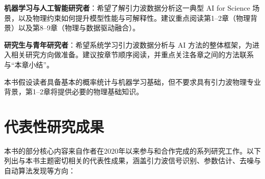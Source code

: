 \textbf{机器学习与人工智能研究者}：希望了解引力波数据分析这一典型 AI for Science 场景，以及物理约束如何提升模型性能与可解释性。建议重点阅读第1--2章（物理背景）以及第8--9章（物理与数据驱动融合）。

\textbf{研究生与青年研究者}：希望系统学习引力波数据分析与 AI 方法的整体框架，为进入相关研究方向做准备。建议按章节顺序阅读，并重点关注各章之间的方法联系与“本章小结”。

本书假设读者具备基本的概率统计与机器学习基础，但不要求具有引力波物理专业背景，第1--2章将提供必要的物理基础知识。

\medskip
\noindent{}

\section*{代表性研究成果}

本书的部分核心内容来自作者在2020年以来参与和合作完成的系列研究工作。以下列出与本书主题密切相关的代表性成果，涵盖引力波信号识别、参数估计、去噪与自动算法发现等方向：

